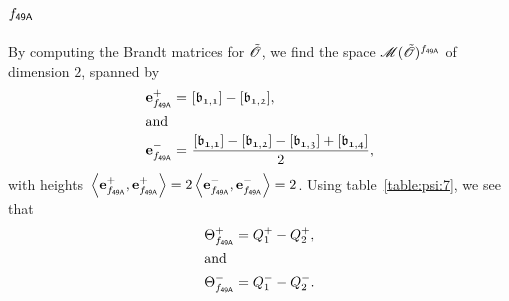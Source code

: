 \subsection{$f_\mathsf{{49A}}$}
By computing the Brandt matrices for ${\tilde{{\mathscr{O}}}}$,
we find the space $\operatorname{{\mathscr M}}({\tilde{{\mathscr{O}}}})^{f_\mathsf{{49A}}}
$
of dimension $2$, spanned by
\begin{align*}
  \e{\mf{49A}}^+ = &\ \cls{b_{1,1}}-\cls{b_{1,2}},\\
\intertext{and}
  \e{\mf{49A}}^- = &\ \frac{\cls{b_{1,1}}-\cls{b_{1,2}}-\cls{b_{1,3}}+\cls{b_{1,4}}}{2},\\
\end{align*}
with heights $\,\<\e{\mf{49A}}^+,\e{\mf{49A}}^+>=2\,\<\e{\mf{49A}}^-,\e{\mf{49A}}^->=2$.
Using table~\ref{table:psi:7},
we see that
\begin{align*}
  {\Theta}^+_{f_\mathsf{{49A}}} & =  Q_{1}^{+} - Q_{2}^{+}, \\
\intertext{and}
  {\Theta}^-_{f_\mathsf{{49A}}} & =  Q_{1}^{-} - Q_{2}^{-}. \\
\end{align*}
